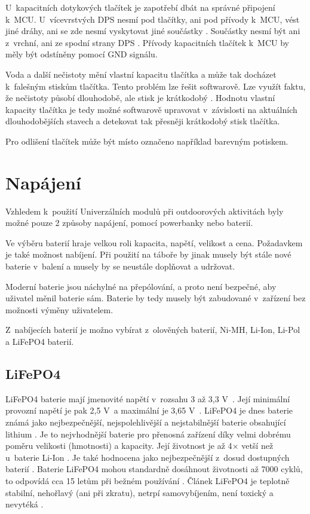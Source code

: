 U~kapacitních dotykových tlačítek je zapotřebí dbát na správné připojení k~MCU. U~vícevrstvých DPS nesmí pod tlačítky, ani pod přívody
k~MCU, vést jiné dráhy, ani se zde nesmí vyskytovat jiné součástky \cite{PrincipKapTl}. Součástky nesmí být ani z~vrchní, ani ze spodní 
strany DPS \cite{PrincipKapTl}. Přívody kapacitních tlačítek k~MCU by měly být odstíněny pomocí GND signálu.

Voda a další nečistoty mění vlastní kapacitu tlačítka a může tak docházet k~falešným stiskům tlačítka. Tento problém lze řešit softwarově. 
Lze využít faktu, že nečistoty působí dlouhodobě, ale stisk je krátkodobý \cite{PrincipKapTl}. Hodnotu vlastní kapacity tlačítka je tedy
možné softwarově upravovat v~závislosti na aktuálních dlouhodobějších stavech a detekovat tak přesněji krátkodobý stisk tlačítka.

Pro odlišení tlačítek může být místo označeno například barevným potiskem. 

\section{Napájení}
Vzhledem k~použití Univerzálních modulů při outdoorových aktivitách byly možné pouze 2 způsoby napájení, pomocí powerbanky nebo baterií. 

Ve výběru baterií hraje velkou roli kapacita, napětí, velikost a cena. Požadavkem je také možnost nabíjení. Při použití na táboře by jinak musely být stále 
nové baterie v~balení a musely by se neustále doplňovat a udržovat.

Moderní baterie jsou náchylné na přepólování, a proto není bezpečné, aby uživatel měnil baterie sám. Baterie by tedy musely být zabudované v~zařízení 
bez možnosti výměny uživatelem. 


Z~nabíjecích baterií je možno vybírat z~olověných baterií, Ni-MH, Li-Ion, Li-Pol a LiFePO4 baterií.

\subsection{LiFePO4}
LiFePO4 baterie mají jmenovité napětí v~rozsahu 3 až 3,3 V~\cite{LiFePO4_malina}. Její minimální provozní napětí je pak 2,5 V~a maximální je 3,65 V~\cite{LiFePO4_malina}.
LiFePO4 je dnes baterie známá jako nejbezpečnější, nejspolehlivější a nejstabilnější baterie obsahující lithium \cite{LiFePO4_malina}. Je to nejvhodnější baterie pro 
přenosná zařízení díky velmi dobrému poměru velikosti (hmotnosti) a kapacity. Její životnost je až 4$\times$ vetší než u~baterie Li-Ion \cite{LiFePO4_malina}. Je také hodnocena
jako nejbezpečnější z~dosud dostupných baterií \cite{LiFePO4_malina}. Baterie LiFePO4 mohou standardně dosáhnout životnosti až 7000 cyklů, to odpovídá cca 15 letům při bežném
používání \cite{LiFePO4_malina}. Článek LiFePO4 je teplotně stabilní, nehořlavý (ani při zkratu), netrpí samovybíjením, není toxický a nevytéká \cite{LiFePO4_malina}.

